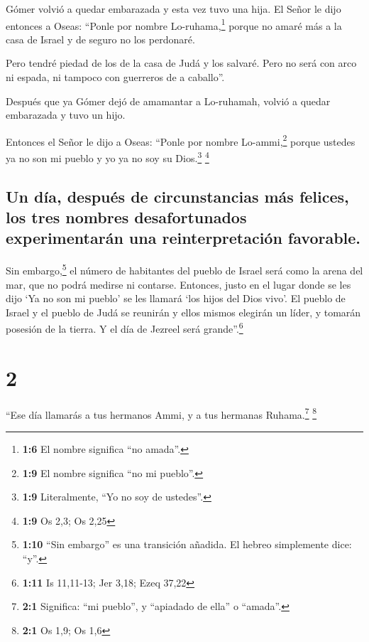  Gómer volvió a quedar embarazada y esta vez tuvo una
hija. El Señor le dijo entonces a Oseas: ``Ponle por nombre
Lo-ruhama,\footnote{\textbf{1:6} El nombre significa ``no amada''.}
porque no amaré más a la casa de Israel y de seguro no los perdonaré.

 Pero tendré piedad de los de la casa de Judá y los
salvaré. Pero no será con arco ni espada, ni tampoco con guerreros de a
caballo''.

 Después que ya Gómer dejó de amamantar a Lo-ruhamah,
volvió a quedar embarazada y tuvo un hijo.

 Entonces el Señor le dijo a Oseas: ``Ponle por nombre
Lo-ammi,\footnote{\textbf{1:9} El nombre significa ``no mi pueblo''.}
porque ustedes ya no son mi pueblo y yo ya no soy su Dios.\footnote{\textbf{1:9}
  Literalmente, ``Yo no soy de ustedes''.} \footnote{\textbf{1:9} Os
  2,3; Os 2,25}

\hypertarget{un-duxeda-despuuxe9s-de-circunstancias-muxe1s-felices-los-tres-nombres-desafortunados-experimentaruxe1n-una-reinterpretaciuxf3n-favorable.}{%
\subsection{Un día, después de circunstancias más felices, los tres
nombres desafortunados experimentarán una reinterpretación
favorable.}\label{un-duxeda-despuuxe9s-de-circunstancias-muxe1s-felices-los-tres-nombres-desafortunados-experimentaruxe1n-una-reinterpretaciuxf3n-favorable.}}

 Sin embargo,\footnote{\textbf{1:10} ``Sin embargo'' es
  una transición añadida. El hebreo simplemente dice: ``y''.} el número
de habitantes del pueblo de Israel será como la arena del mar, que no
podrá medirse ni contarse. Entonces, justo en el lugar donde se les dijo
`Ya no son mi pueblo' se les llamará `los hijos del Dios vivo'.
 El pueblo de Israel y el pueblo de Judá se reunirán y
ellos mismos elegirán un líder, y tomarán posesión de la tierra. Y el
día de Jezreel será grande''.\footnote{\textbf{1:11} Is 11,11-13; Jer
  3,18; Ezeq 37,22}

\hypertarget{section-1}{%
\section{2}\label{section-1}}

 ``Ese día llamarás a tus hermanos Ammi, y a tus hermanas
Ruhama.\footnote{\textbf{2:1} Significa: ``mi pueblo'', y ``apiadado de
  ella'' o ``amada''.} \footnote{\textbf{2:1} Os 1,9; Os 1,6}


